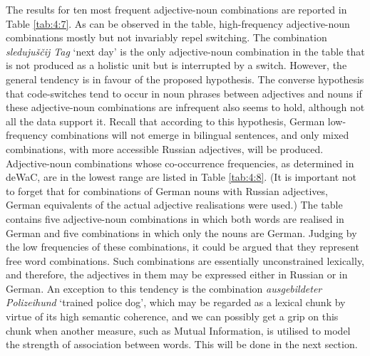 The results for ten most frequent adjective-noun combinations are reported in Table \ref{tab:4:7}. As can be observed in the table, high-frequency adjective-noun combinations mostly but not invariably repel switching. The combination \textit{sledujuščij Tag} `next day' is the only adjective-noun combination in the table that is not produced as a holistic unit but is interrupted by a switch. However, the general tendency is in favour of the proposed hypothesis. The converse hypothesis that code-switches tend to occur in noun phrases between adjectives and nouns if these adjective-noun combinations are infrequent also seems to hold, although not all the data support it. Recall that according to this hypothesis, German low-frequency combinations will not emerge in bilingual sentences, and only mixed combinations, with more accessible Russian adjectives, will be produced. Adjective-noun combinations whose co-occurrence frequencies, as determined in deWaC, are in the lowest range are listed in Table \ref{tab:4:8}. (It is important not to forget that for combinations of German nouns with Russian adjectives, German equivalents of the actual adjective realisations were used.) The table contains five adjective-noun combinations in which both words are realised in German and five combinations in which only the nouns are German. Judging by the low frequencies of these combinations, it could be argued that they represent free word combinations. Such combinations are essentially unconstrained lexically, and therefore, the adjectives in them may be expressed either in Russian or in German. An exception to this tendency is the combination \textit{ausgebildeter Polizeihund} `trained police dog', which may be regarded as a lexical chunk by virtue of its high semantic coherence, and we can possibly get a grip on this chunk when another measure, such as Mutual Information, is utilised to model the strength of association between words. This will be done in the next section.

